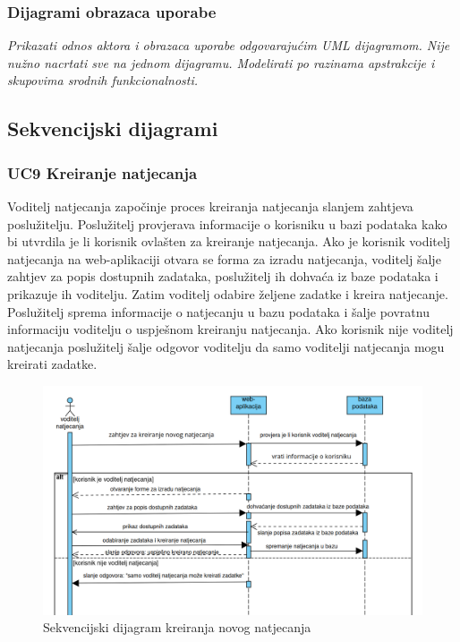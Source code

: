 					
				\subsubsection{Dijagrami obrazaca uporabe}
					
					\textit{Prikazati odnos aktora i obrazaca uporabe odgovarajućim UML dijagramom. Nije nužno nacrtati sve na jednom dijagramu. Modelirati po razinama apstrakcije i skupovima srodnih funkcionalnosti.}
				\eject
				
			\subsection{Sekvencijski dijagrami}

				\vspace{10mm}
				\subsubsection*{UC9 Kreiranje natjecanja}
				
				Voditelj natjecanja započinje proces kreiranja natjecanja slanjem zahtjeva poslužitelju. Poslužitelj provjerava informacije o korisniku u bazi podataka kako bi utvrdila je li korisnik ovlašten za kreiranje natjecanja. Ako je korisnik voditelj natjecanja na web-aplikaciji otvara se forma za izradu natjecanja, voditelj šalje zahtjev za popis dostupnih zadataka, poslužitelj ih dohvaća iz baze podataka i prikazuje ih voditelju. Zatim voditelj odabire željene zadatke i kreira natjecanje. Poslužitelj sprema informacije o natjecanju u bazu podataka i šalje povratnu informaciju voditelju o uspješnom kreiranju natjecanja. Ako korisnik nije voditelj natjecanja poslužitelj šalje odgovor voditelju da samo voditelji natjecanja mogu kreirati zadatke.
				\vspace{20mm}

				\begin{figure}[htbp]
					\centering
					\includegraphics[width=\linewidth]{slike/kreiranje_natjecanja.png}
					\caption{Sekvencijski dijagram kreiranja novog natjecanja}\label{fig:seqdiag_natjecanja}
				\end{figure}
				
